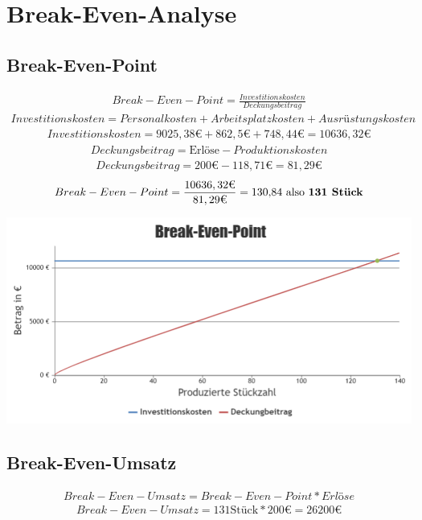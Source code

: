 \documentclass[paper=a4, 12pt]{scrreprt}
\begin{document}
	\section{Break-Even-Analyse}\hfill \break
		\subsection{Break-Even-Point}\hfill \break
		\begin{align*} 
		Break-Even-Point = \frac{Investitionskosten}{Deckungsbeitrag}
		\end{align*} 
		\begin{align*} 
		Investitionskosten = Personalkosten + Arbeitsplatzkosten + Ausrüstungskosten
		\end{align*} 
		\begin{align*} 
		Investitionskosten = 9025,38\text{€} + 862,5\text{€} + 748,44\text{€} = 10636,32\text{€}
		\end{align*} 
		\begin{align*} 
		Deckungsbeitrag = \text{Erlöse} - Produktionskosten
		\end{align*} 
		\begin{align*}
		Deckungsbeitrag = 200\text{€} - 118,71\text{€} = 81,29\text{€}
		\end{align*} 
		\begin{align*} 
		Break-Even-Point = \frac{10636,32\text{€}}{81,29\text{€}} = \text{130,84 also \textbf{131 Stück}}
		\end{align*} 
		\begin{adjustbox}{center,caption={Brek-Even-Point},label={fig:BEP.PNG},nofloat=figure,vspace=\bigskipamount}
			\includegraphics[width=\textwidth]{img/BEP.PNG}
		\end{adjustbox}
			
		\subsection{Break-Even-Umsatz}\hfill \break
		\begin{align*} 
		Break-Even-Umsatz = Break-Even-Point * Erlöse
		\end{align*} 
		\begin{align*} 
		Break-Even-Umsatz = 131 \text{Stück} * 200\text{€} = 26200\text{€}
		\end{align*} 
\newpage
			
\end{document}
